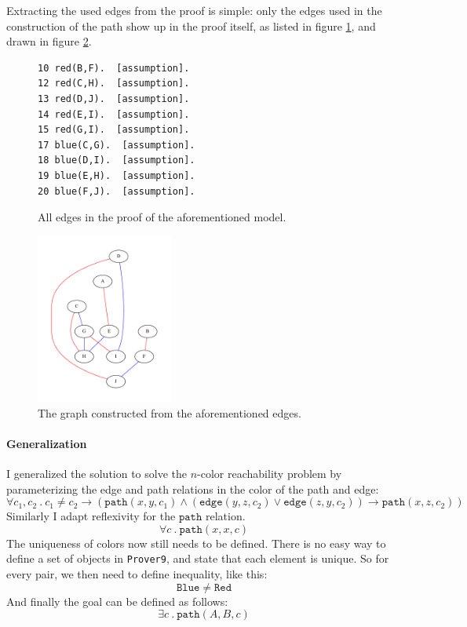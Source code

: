 \documentclass[12pt]{article}
\newcommand{\bimp}{\rightarrow}
\newcommand{\band}{\wedge}
\newcommand{\bor}{\vee}
\newcommand{\provernine}{\texttt{Prover9}\xspace}
\newcommand{\edge}[3]{\mathtt{edge}(#1, #2, #3)}
\newcommand{\path}[3]{\mathtt{path}(#1, #2, #3)}
\begin{document}
Extracting the used edges from the proof is simple:
only the edges used in the construction of the path show up in the proof itself,
as listed in figure \ref{fig:proof-assump}, and drawn in figure \ref{fig:proof-graph}.
\begin{figure}[H]
	\begin{center}
		\begin{lstlisting}[frame=single]
10 red(B,F).  [assumption].
12 red(C,H).  [assumption].
13 red(D,J).  [assumption].
14 red(E,I).  [assumption].
15 red(G,I).  [assumption].
17 blue(C,G).  [assumption].
18 blue(D,I).  [assumption].
19 blue(E,H).  [assumption].
20 blue(F,J).  [assumption].
		\end{lstlisting}
	\end{center}
	\caption{\label{fig:proof-assump} All edges in the proof of the aforementioned model.}
\end{figure}
\begin{figure}[H]
	\begin{center}
		\includegraphics[width=0.4\textwidth]{graph-fixed.pdf}
	\end{center}
	\caption{\label{fig:proof-graph} The graph constructed from the aforementioned edges.}
\end{figure}

\paragraph{Generalization}
I generalized the solution to solve the $n$-color reachability problem
by parameterizing the edge and path relations in the color of the path and edge:
\[ \forall c_1, c_2 ~.~ c_1 \neq c_2 \bimp (\path{x}{y}{c_1} \band ( \edge{y}{z}{c_2} \bor \edge{z}{y}{c_2} ) \bimp \path{x}{z}{c_2} ) \]
Similarly I adapt reflexivity for the $\mathtt{path}$ relation.
\[ \forall c ~.~ \path{x}{x}{c} \]
The uniqueness of colors now still needs to be defined.
There is no easy way to define a set of objects in \provernine, and state
that each element is unique.
So for every pair, we then need to define inequality, like this:
\[ \mathtt{Blue} \neq \mathtt{Red} \]
And finally the goal can be defined as follows:
\[ \exists c ~.~ \path{A}{B}{c} \]
\end{document}
